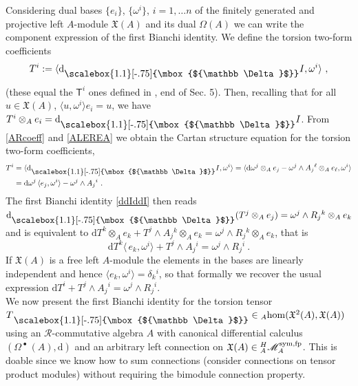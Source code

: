 \documentclass[12pt]{article}
\numberwithin{equation}{section}
\theoremstyle{plain}
\theoremstyle{definition}
\theoremstyle{remark}
\def\Vect{\mathfrak{X}}
\def\oA{\otimes_A}
\def\dd{\mathrm{d}}
\def\MMM{\mathscr{M}}
\def\le{\langle}
\def\re{\rangle}
\def\le{\langle}
\def\re{\rangle}
\def\AA{A}
\def\dd{{\nabla}}
\def\Tsf{\mathsf{T}}
\def\sym{{\rm{sym}}}
\def\dd{\mathrm{d}}
\def\catfp{{{}^H_\AA\MMM_\AA^{\sym, \rm{fp}}}}
\def\pstd{{}^{\phantom{J}}_{\raisebox{\depth}{\scalebox{1.1}[-.75]{\mbox{${\mathbb
            \Delta}$}}}}}
\def\stD{\dd\pstd}
\def\stD{\dd\pstd}
\def\stdd{\phantom{\!\!\!\dd}\pstd}
\def\OM{{\Omega^{\!\!\;\bullet}\!\!\:(A)}}
\def\hom{\mathrm{hom}}
\begin{document}
Considering  dual bases
$\{e_i\}$, $\{\omega^i\}$, $i=1,\ldots n$ of the finitely generated and projective left $A$-module $\Vect(A)$ and its dual  $\Omega(A)$
we can write the component expression of the first Bianchi identity.
We define the torsion two-form coefficients
\begin{equation}\label{T2form}
  T^i:=\le\stD I,\omega^i\re~,
  \end{equation}
(these equal the $\Tsf^i$ ones defined in \cite{LC}, end of Sec. 5). Then, recalling that for all $u\in \Vect(A)$,  $\le u, \omega^i\re e_i=u$, we have
$T^i\oA e_i=\stD I$. From \eqref{ARcoeff} and \eqref{ALEREA} we obtain the Cartan structure equation for the torsion two-form coefficients,
\begin{equation}\label{TCartan}\begin{split}
  T^i&=\le\stD I,\omega^i\re=\le\dd\omega^j\oA e_j-\omega^j\wedge A_j{}^\ell\oA e_\ell,\omega^i\re\\ &=\dd \omega^j\,\le e_j,\omega^i\re-\omega^j\wedge A_j{}^i~.
\end{split}
\end{equation}
The first Bianchi identity \eqref{ddIddI} then reads
$\stD (T^j\oA e_j)=\omega^j\wedge R_j{}^k\oA e_k$ and is equivalent to $\dd T^k\oA e_k+ T^j\wedge A_j{}^k\oA e_k=\omega^j\wedge R_j{}^k\oA e_k$, that is
\begin{equation}\label{TBianchi}
  \dd T^k\le \,e_k,\omega^i\re+T^j\wedge A_j{}^i=\omega^j\wedge R_j{}^i~.
\end{equation}
If $\Vect(A)$ is a free left $A$-module the elements in the bases are linearly independent and hence $\le e_k , \omega^i\re=\delta_k{}^i$, so that formally we recover the usual expression $ \dd T^i+T^j\wedge A_j{}^i=\omega^j\wedge R_j{}^i$.
\\

    
We now present the first Bianchi identity for the torsion tensor $T\stdd\in {}_A\hom(\Vect^2(A),\Vect(A))$ using an ${\mathcal{R}}$-commutative algebra $A$ with canonical differential calculus $(\OM, \dd)$ and  an arbitrary left connection on  $\Vect(A)\in  \catfp$. This is doable since we know how to sum connections (consider connections on tensor product modules) without requiring the bimodule connection property.
\\
\end{document}
